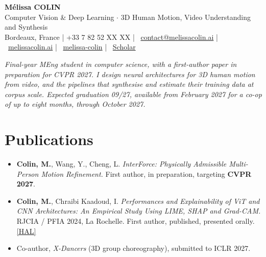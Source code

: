 \documentclass[10pt, letterpaper]{article}
\providecommand{\myphone}{+33 7 82 52 XX XX}
\begin{document}
\begin{center}
    {\fontsize{19}{19}\selectfont \textbf{Mélissa COLIN}} \\[3pt]
    {\normalsize Computer Vision \& Deep Learning $\cdot$ 3D Human Motion, Video Understanding and Synthesis} \\[3pt]

    \small{
    \faMapMarker* Bordeaux, France \;|\;
    \faPhone* \myphone{} \;|\;
    \faEnvelope~\href{mailto:contact@melissacolin.ai}{contact@melissacolin.ai} \;|\;
    \faGlobe~\href{https://melissacolin.ai}{melissacolin.ai} \;|\;
    \faGithub~\href{https://github.com/melissa-colin}{melissa-colin} \;|\;
    \faGraduationCap~\href{https://scholar.google.com/citations?user=7r7iFpsAAAAJ}{Scholar}
    }
\end{center}

\vspace{1pt}

{\small \textit{Final-year MEng student in computer science, with a first-author paper in preparation for CVPR 2027. I design neural architectures for 3D human motion from video, and the pipelines
that synthesise and estimate their training data at corpus scale. Expected graduation 09/27,
available from February 2027 for a co-op of up to eight months, through October 2027.}}

\section{Publications}
\begin{itemize}
    \item \textbf{Colin, M.}, Wang, Y., Cheng, L. \textit{InterForce: Physically Admissible Multi-Person Motion Refinement.} First author, in preparation, targeting \textbf{CVPR 2027}.
    \item \textbf{Colin, M.}, Chraibi Kaadoud, I. \textit{Performances and Explainability of ViT and CNN Architectures: An Empirical Study Using LIME, SHAP and Grad-CAM.} RJCIA / PFIA 2024, La Rochelle. First author, published, presented orally. \href{https://hal.science/hal-04641791}{[HAL]}
    \item Co-author, \textit{X-Dancers} (3D group choreography), submitted to ICLR 2027.
\end{itemize}

\end{document}
